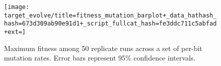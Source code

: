 \begin{figure*}
\begin{center}

\texttt{[image: target\_evolve/title=fitness\_mutation\_barplot+\_data\_hathash\_hash=673d309ab90e91d1+\_script\_fullcat\_hash=fe3ddc711c5abfad+ext=]}
\caption{
Maximum fitness among 50 replicate runs across a set of per-bit mutation rates.
Error bars represent 95\% confidence intervals.
}
\label{fig:evolve_mutsweep}

\end{center}
\end{figure*}
